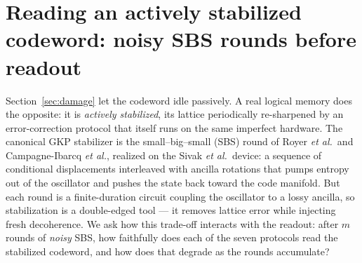 
\section{Reading an actively stabilized codeword: noisy SBS rounds before readout}\label{sec:sbs}

Section~\ref{sec:damage} let the codeword idle passively. A real logical memory does the
opposite: it is \emph{actively stabilized}, its lattice periodically re-sharpened by an
error-correction protocol that itself runs on the same imperfect hardware. The canonical GKP
stabilizer is the small--big--small (SBS) round of Royer \emph{et al.}\ and
Campagne-Ibarcq \emph{et al.}, realized on the Sivak \emph{et al.}\ device: a sequence of
conditional displacements interleaved with ancilla rotations that pumps entropy out of the
oscillator and pushes the state back toward the code manifold. But each round is a finite-duration
circuit coupling the oscillator to a lossy ancilla, so stabilization is a double-edged tool ---
it removes lattice error while injecting fresh decoherence. We ask how this trade-off interacts
with the readout: after $m$ rounds of \emph{noisy} SBS, how faithfully does each of the seven
protocols read the stabilized codeword, and how does that degrade as the rounds accumulate?

